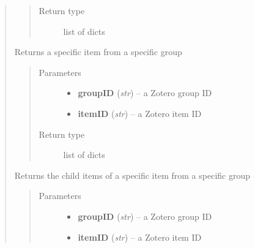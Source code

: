 \documentclass[letterpaper,10pt,english]{sphinxmanual}
\begin{document}
\begin{quote}
\begin{fulllineitems}
\begin{quote}
\begin{description}
\item[{Return type}] \leavevmode
list of dicts

\end{description}\end{quote}

\end{fulllineitems}


\begin{fulllineitems}
\label{index:pyzotero.zotero.Zotero.group_item}
Returns a specific item from a specific group
\begin{quote}\begin{description}
\item[{Parameters}] \leavevmode\begin{itemize}
\item {} 
\textbf{groupID} (\emph{str}) -- a Zotero group ID

\item {} 
\textbf{itemID} (\emph{str}) -- a Zotero item ID

\end{itemize}

\item[{Return type}] \leavevmode
list of dicts

\end{description}\end{quote}

\end{fulllineitems}


\begin{fulllineitems}
\label{index:pyzotero.zotero.Zotero.group_item_children}
Returns the child items of a specific item from a specific group
\begin{quote}\begin{description}
\item[{Parameters}] \leavevmode\begin{itemize}
\item {} 
\textbf{groupID} (\emph{str}) -- a Zotero group ID

\item {} 
\textbf{itemID} (\emph{str}) -- a Zotero item ID


\end{itemize}
\end{description}
\end{quote}
\end{fulllineitems}
\end{quote}
\end{document}
